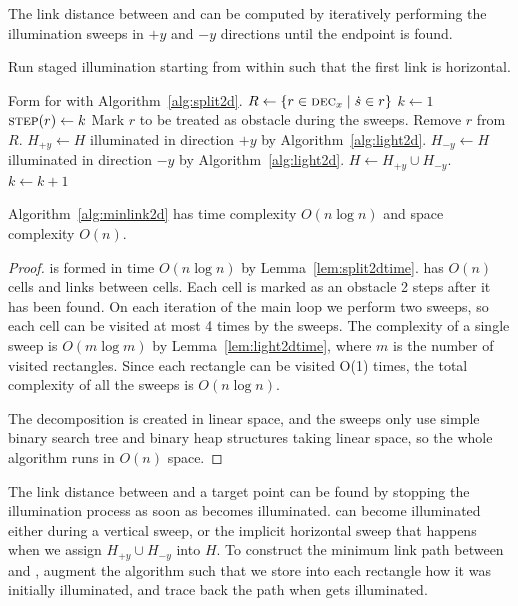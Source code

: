 \documentclass[english,gradu]{tktltiki2018}
\begin{document}
The link distance between \spt and \ept can be computed by iteratively performing the illumination sweeps in $+y$ and $-y$ directions until the endpoint is found.

\begin{alg}\label{alg:minlink2d}
Run staged illumination starting from \spt within \fspace such that the first link is horizontal.
\begin{algorithmic}
\State Form  for \fspace with Algorithm~\ref{alg:split2d}.
\State $R\gets\left\{r\in\textsc{dec}_{x} \mid \dot{s}\in r\right\}$
\State $k\gets 1$
			\State $\textsc{step}{(r)}\gets k$
			\State Mark $r$ to be treated as obstacle during the sweeps.
			\State Remove $r$ from $R$.
		\EndIf
	\EndFor
	\State $H_{+y}\gets H$ illuminated in direction $+y$ by Algorithm~\ref{alg:light2d}.
	\State $H_{-y}\gets H$ illuminated in direction $-y$ by Algorithm~\ref{alg:light2d}.
	\State $H\gets H_{+y}\cup H_{-y}$.
	\State $k\gets k+1$
\EndWhile
\end{algorithmic}
\end{alg}

\begin{theo}Algorithm~\ref{alg:minlink2d} has time complexity $O(n\log n)$ and space complexity $O(n)$.\end{theo}
\begin{proof}
 is formed in time $O(n\log n)$ by Lemma~\ref{lem:split2dtime}.
 has $O(n)$ cells and links between cells.
Each cell is marked as an obstacle 2 steps after it has been found.
On each iteration of the main loop we perform two sweeps, so each cell can be visited at most 4 times by the sweeps.
The complexity of a single sweep is $O(m\log m)$ by Lemma~\ref{lem:light2dtime}, where $m$ is the number of visited rectangles.
Since each rectangle can be visited O(1) times, the total complexity of all the sweeps is $O(n\log n)$.

The decomposition is created in linear space, and the sweeps only use simple binary search tree and binary heap structures taking linear space, so the whole algorithm runs in $O(n)$ space.
\end{proof}

The link distance between \spt and a target point \ept can be found by stopping the illumination process as soon as \ept becomes illuminated.
\epts can become illuminated either during a vertical sweep, or the implicit horizontal sweep that happens when we assign $H_{+y}\cup H_{-y}$ into $H$.
To construct the minimum link path between \spt and \ept, augment the algorithm such that we store into each rectangle how it was initially illuminated, and trace back the path when \ept gets illuminated.
\end{document}
